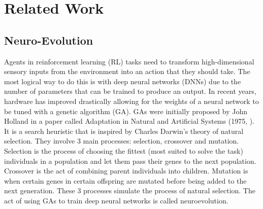 \chapter{Related Work}

\label{ch:background}

\section{Neuro-Evolution}
Agents in reinforcement learning (RL) tasks need to transform high-dimensional sensory inputs from the environment into an action that they should take. The most logical way to do this is with deep neural networks (DNNs) due to the number of parameters that can be trained to produce an output. In recent years, hardware has improved drastically allowing for the weights of a neural network to be tuned with a genetic algorithm (GA). GAs were initially proposed by John Holland in a paper called Adaptation in Natural and Artificial Systems (1975, \cite{holland}). It is a search heuristic that is inspired by Charles Darwin's theory of natural selection. They involve 3 main processes: selection, crossover and mutation. Selection is the process of choosing the fittest (most suited to solve the task) individuals in a population and let them pass their genes to the next population. Crossover is the act of combining parent individuals into children. Mutation is when certain genes in certain offspring are mutated before being added to the next generation. These 3 processes simulate the process of natural selection. The act of using GAs to train deep neural networks is called neuroevolution.

\paragraph{}

